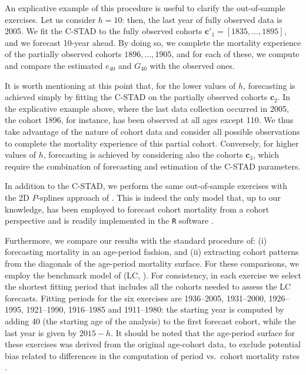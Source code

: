 \documentclass[11pt, a4paper]{article}
\begin{document}
An explicative example of this procedure is useful to clarify the out-of-sample exercises. Let us consider $h=10$: then, the last year of fully observed data is 2005. We fit the C-STAD to the fully observed cohorts {\color{red}$\bm{c}'_1=\left[1835,\dots,1895\right]$}, and we forecast 10-year ahead. By doing so, we complete the mortality experience of the partially observed cohorts $1896,\ldots,1905$, and for each of these, we compute and compare the estimated $e_{40}$ and $G_{40}$ with the observed ones. 

It is worth mentioning at this point that, for the lower values of $h$, forecasting is achieved simply by fitting the C-STAD on the partially observed cohorts $\bm{c}_2$. In the explicative example above, where the last data collection occurred in 2005, the cohort 1896, for instance, has been observed at all ages except 110. We thus take advantage of the nature of cohort data and consider all possible observations to complete the mortality experience of this partial cohort.  Conversely, for higher values of $h$, forecasting is achieved by considering also the cohorts $\bm{c}_3$, which require the combination of forecasting and estimation of the C-STAD parameters. 

In addition to the C-STAD, we perform the same out-of-sample exercises with the 2D $P$-splines approach of \cite{currie2004smoothing}. This is indeed the only model that, up to our knowledge, has been employed to forecast cohort mortality from a cohort perspective \citep{cmi2007stochastic} and is readily implemented in the \texttt{R} software \cite[in the \texttt{MortalitySmooth} package,][]{camarda2012mortalitysmooth}. 

{\color{red} Furthermore, we compare our results with the standard procedure of: (i) forecasting mortality in an age-period fashion, and (ii) extracting cohort patterns from the diagonals of the age-period mortality surface. For these comparisons, we employ the benchmark model of \citeauthor{lee1992modeling} (LC, \citeyear{lee1992modeling}). For consistency, in each exercise we select the shortest fitting period that includes all the cohorts needed to assess the LC forecasts. Fitting periods for the six exercises are 1936--2005, 1931--2000, 1926--1995, 1921--1990, 1916--1985 and 1911--1980: the starting year is computed by adding 40 (the starting age of the analysis) to the first forecast cohort, while the last year is given by $2015 - h$. It should be noted that the age-period surface for these exercises was derived from the original age-cohort data, to exclude potential bias related to differences in the computation of period vs.~cohort mortality rates \cite[see][pp.~29--33]{wilmoth2017protocol}. \par
}
\end{document}
